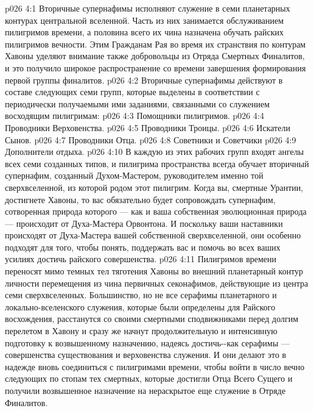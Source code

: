 \vs p026 4:1 Вторичные супернафимы исполняют служение в семи планетарных контурах центральной вселенной. Часть из них занимается обслуживанием пилигримов времени, а половина всего их чина назначена обучать райских пилигримов вечности. Этим Гражданам Рая во время их странствия по контурам Хавоны уделяют внимание также добровольцы из Отряда Смертных Финалитов, и это получило широкое распространение со времени завершения формирования первой группы финалитов.
\vs p026 4:2 \pc Вторичные супернафимы действуют в составе следующих семи групп, которые выделены в соответствии с периодически получаемыми ими заданиями, связанными со служением восходящим пилигримам:
\vs p026 4:3 \bibnobreakspace Помощники пилигримов.
\vs p026 4:4 \bibnobreakspace Проводники Верховенства.
\vs p026 4:5 \bibnobreakspace Проводники Троицы.
\vs p026 4:6 \bibnobreakspace Искатели Сынов.
\vs p026 4:7 \bibnobreakspace Проводники Отца.
\vs p026 4:8 \bibnobreakspace Советники и Советчики
\vs p026 4:9 \bibnobreakspace Дополнители отдыха.
\vs p026 4:10 \pc В каждую из этих рабочих групп входят ангелы всех семи созданных типов, и пилигрима пространства всегда обучает вторичный супернафим, созданный Духом\hyp{}Мастером, руководителем именно той сверхвселенной, из которой родом этот пилигрим. Когда вы, смертные Урантии, достигнете Хавоны, то вас обязательно будет сопровождать супернафим, сотворенная природа которого --- как и ваша собственная эволюционная природа --- происходит от Духа\hyp{}Мастера Орвонтона. И поскольку ваши наставники происходят от Духа\hyp{}Мастера вашей собственной сверхвселенной, они особенно подходят для того, чтобы понять, поддержать вас и помочь во всех ваших усилиях достичь райского совершенства.
\vs p026 4:11 Пилигримов времени переносят мимо темных тел тяготения Хавоны во внешний планетарный контур личности перемещения из чина первичных секонафимов, действующие из центра семи сверхвселенных. Большинство, но не все серафимы планетарного и локально\hyp{}вселенского служения, которые были определены для Райского восхождения, расстанутся со своими смертными сподвижниками перед долгим перелетом в Хавону и сразу же начнут продолжительную и интенсивную подготовку к возвышенному назначению, надеясь достичь\hyp{}\hyp{}как серафимы --- совершенства существования и верховенства служения. И они делают это в надежде вновь соединиться с пилигримами времени, чтобы войти в число вечно следующих по стопам тех смертных, которые достигли Отца Всего Сущего и получили возвышенное назначение на нераскрытое еще служение в Отряде Финалитов.
